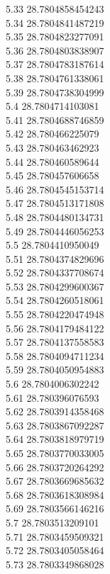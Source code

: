 {5.33	28.7804858454243\\
5.34	28.7804841487219\\
5.35	28.7804823277091\\
5.36	28.7804803838907\\
5.37	28.7804783187614\\
5.38	28.7804761338061\\
5.39	28.7804738304999\\
5.4	28.7804714103081\\
5.41	28.7804688746859\\
5.42	28.780466225079\\
5.43	28.780463462923\\
5.44	28.780460589644\\
5.45	28.780457606658\\
5.46	28.7804545153714\\
5.47	28.7804513171808\\
5.48	28.7804480134731\\
5.49	28.7804446056253\\
5.5	28.7804410950049\\
5.51	28.7804374829696\\
5.52	28.7804337708674\\
5.53	28.7804299600367\\
5.54	28.7804260518061\\
5.55	28.7804220474948\\
5.56	28.7804179484122\\
5.57	28.7804137558583\\
5.58	28.7804094711234\\
5.59	28.7804050954883\\
5.6	28.7804006302242\\
5.61	28.780396076593\\
5.62	28.7803914358468\\
5.63	28.7803867092287\\
5.64	28.7803818979719\\
5.65	28.7803770033005\\
5.66	28.7803720264292\\
5.67	28.7803669685632\\
5.68	28.7803618308984\\
5.69	28.7803566146216\\
5.7	28.7803513209101\\
5.71	28.7803459509321\\
5.72	28.7803405058464\\
5.73	28.7803349868028\\
}
